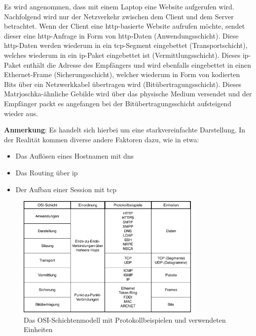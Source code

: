 \documentclass[titlepage]{report}
\begin{document}
Es wird angenommen, dass mit einem Laptop eine Website aufgerufen wird.
Nachfolgend wird nur der Netzverkehr zwischen dem Client und dem Server
betrachtet. Wenn der Client eine \gls{http}\hyp{}basierte Website
aufrufen möchte, sendet dieser eine \gls{http}\hyp{}Anfrage in Form von
\gls{http}\hyp{}Daten (Anwendungsschicht). Diese \gls{http}\hyp{}Daten
werden wiederum in ein \gls{tcp}\hyp{}Segment eingebettet (Transportschicht),
welches wiederum in ein \gls{ip}\hyp{}Paket eingebettet ist
(Vermittlungsschicht). Dieses \gls{ip}\hyp{}Paket enthält die Adresse
des Empfängers und wird ebenfalls eingebettet in einen
Ethernet\hyp{}Frame (Sicherungsschicht), welcher wiederum in Form von
kodierten Bits über ein Netzwerkkabel übertragen wird (Bitübertragungsschicht).
Dieses Matrjoschka\hyp{}ähnliche Gebilde wird über das physische
Medium versendet und der Empfänger packt es angefangen bei der
Bitübertragungsschicht aufsteigend wieder aus.

\textbf{Anmerkung}: Es handelt sich hierbei um eine starkvereinfachte
Darstellung. In der Realität kommen diverse andere Faktoren dazu, wie in
etwa:
\begin{itemize}
    \item Das Auflösen eines Hostnamen mit \gls{dns}
    \item Das Routing über \gls{ip}
    \item Der Aufbau einer Session mit \gls{tcp}
\end{itemize}
\begin{figure}[H]
    \centering
    \includegraphics[width=0.8\textwidth]{figures/osi.pdf}
    \caption{Das OSI-Schichtenmodell mit Protokollbeispielen und
    verwendeten Einheiten}\label{fig:osi}
\end{figure}
\end{document}
